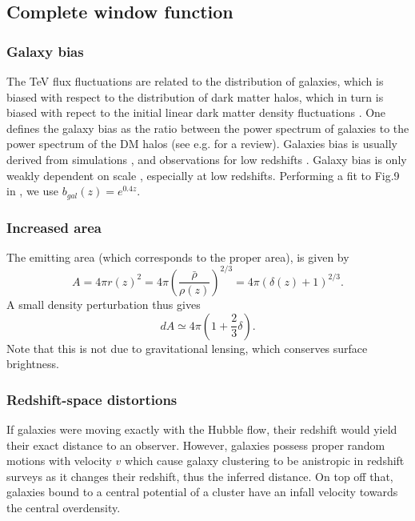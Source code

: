 \documentclass[onecolumn]{emulateapj}
\begin{document}
\subsection{Complete window function}

%
\subsubsection{Galaxy bias}
The TeV flux fluctuations are related to the distribution of galaxies, which is biased with respect to the distribution of dark matter halos, which in turn is biased with repect to the initial linear dark matter density fluctuations  \citep{1996MNRAS.282..347M}.  One defines the galaxy bias as the ratio between the power spectrum of galaxies to the power spectrum of the DM halos (see e.g. \citep{2002PhR...372....1C} for a review).  Galaxies bias is usually derived from simulations \citep{1999MNRAS.307..529K}, and observations for low redshifts \citep{2004ApJ...606..702T}. Galaxy bias is only weakly dependent on scale \citep{1998MNRAS.293..209M}, especially at low redshifts. Performing  a fit to Fig.9 in \citet{2004ApJ...601....1W}, we use $b_{gal}(z)=e^{0.4z}$. 





\subsubsection{Increased area}

 The emitting area (which corresponds to the proper area), is given by
  \begin{equation}
    \label{eq:emitting_area}
A=4\pi r(z)^2=4\pi\left(\frac{\bar{\rho}}{\rho(z)}\right)^{2/3}=4\pi(\delta(z)+1)^{2/3}.
  \end{equation}
A small density perturbation thus gives
\begin{equation}
  \label{eq:pert_area}
dA\simeq 4\pi \left(1+\frac{2}{3}\delta\right).
\end{equation}
Note that this is not due to gravitational lensing, which conserves  surface brightness.


\subsubsection{Redshift-space distortions}
If galaxies were moving exactly with the Hubble flow, their redshift would yield their exact distance to an observer. However, galaxies possess proper random motions with velocity $v$ which cause galaxy clustering to be anistropic in redshift surveys as it changes their redshift, thus the inferred distance. On top off that, galaxies bound to a central potential of a cluster have an infall velocity towards the central overdensity.
\end{document}
